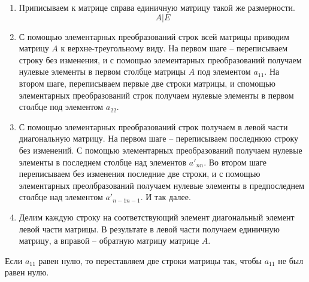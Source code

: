 \begin{enumerate}
  \item Приписываем к матрице справа единичную матрицу такой же размерности. \[
  A | E
  \] 
  \item С помощью элементарных преобразований строк всей матрицы приводим матрицу $A$ к верхне-треугольному виду.
    На первом шаге -- переписываем строку без изменения, и с помощью элементарных преобразований получаем нулевые элементы в первом столбце матрицы $A$ под элементом  $a_{11}$. 
    На втором шаге, переписываем первые две строки матрицы, и спомощью элементарных преобразований строк получаем нулевые элементы в первом столбце под элементом $a_{22}$.

  \item С помощью элементарных преобразований строк получаем в левой части диагональную матрицу. 
    На первом шаге -- переписываем последнюю строку без изменений. 
    С помощью элементарных преобразований получаем нулевые элементы в последнем столбце над элементов $a'_{nn}$. 
    Во втором шаге переписываем без изменения последние две строки, и с помощью элементарных преолбразований получаем нулевые элементы в предпоследнем столбце над элементом  $a'_{n-1 n-1}$. 
    И так далее.

  \item Делим каждую строку на соответствующий элемент диагональный элемент левой части матрицы. 
    В результате в левой части получаем единичную матрицу, а вправой -- обратную матрицу матрице $A$.
\end{enumerate}

\begin{note}
  Если $a_{11}$ равен нулю, то переставляем две строки матрицы так, чтобы $a_{11}$ не был равен нулю.
\end{note}

